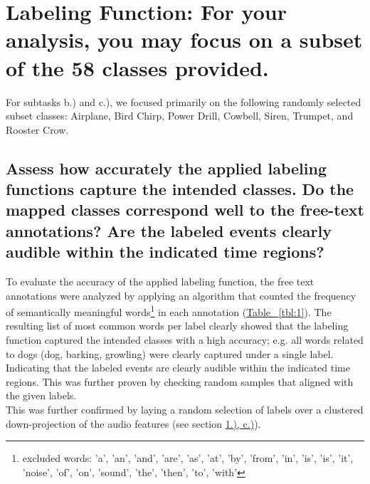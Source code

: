 
\section{Labeling Function: {\normalfont\normalsize For your analysis, you may focus on a subset of the 58 classes provided.}}
\label{sec:Labeling Function}

For subtasks b.) and c.), we focused primarily on the following randomly selected subset classes: Airplane, Bird Chirp, Power Drill, Cowbell, Siren, Trumpet, and Rooster Crow.

\subsection{Assess how accurately the applied labeling functions capture the intended classes. Do the mapped classes correspond well to the free-text annotations? Are the labeled events clearly audible within the indicated time regions?}
\label{sec:Labeling Function:a}
To evaluate the accuracy of the applied labeling function, the free text annotations were analyzed by applying an algorithm that counted the frequency of semantically meaningful words\footnote{excluded words: 'a', 'an', 'and', 'are', 'as', 'at', 'by', 'from', 'in', 'is', 'is', 'it', 'noise', 'of', 'on', 'sound', 'the', 'then', 'to', 'with'} in each annotation (\hyperref[tbl:1]{Table ~\ref*{tbl:1}}).
The resulting list of most common words per label clearly showed that the labeling function captured the intended classes with a high accuracy; e.g. all words related to dogs (dog, barking, growling) were clearly captured under a single label. Indicating that the labeled events are clearly audible within the indicated time regions. This was further proven by checking random samples that aligned with the given labels. \\
This was further confirmed by laying a random selection of labels over a clustered down-projection of the audio features (see section \hyperref[sec:Labeling Function:c]{1.), c.)}).   




